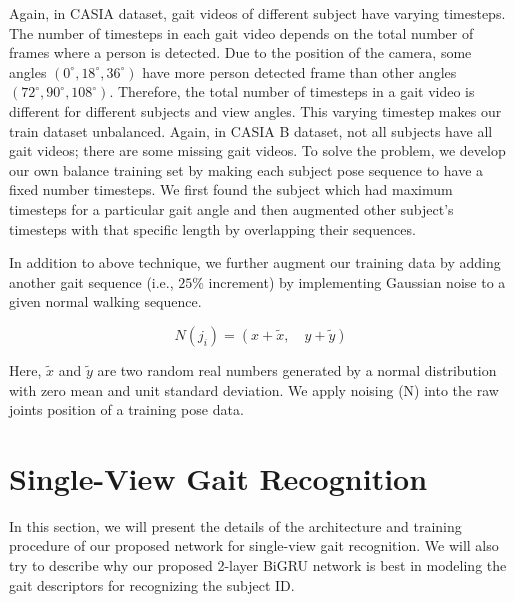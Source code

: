 Again, in CASIA dataset, gait videos of different subject have varying timesteps. The number of timesteps in each gait video depends on the total number of frames where a person is detected. Due to the position of the camera, some angles ${(0^{\circ}, 18^{\circ}, 36^{\circ})}$ have more person detected frame than other angles ${(72^{\circ}, 90^{\circ}, 108^{\circ})}$. Therefore, the total number of timesteps in a gait video is different for different subjects and view angles. This varying timestep makes our train dataset unbalanced. Again, in CASIA B dataset, not all subjects have all gait videos; there are some missing gait videos. To solve the problem, we develop our own balance training set by making each subject pose sequence to have a fixed number timesteps. We first found the subject which had maximum timesteps for a particular gait angle and then augmented other subject's timesteps with that specific length by overlapping their sequences.

In addition to above technique, we further augment our training data by adding another gait sequence (i.e., $ 25\% $ increment) by implementing Gaussian noise to a given normal walking sequence. 

\begin{equation}
N(j_i) = (x + \tilde{x},  \quad y+ \tilde{y})
\end{equation}

Here,  $\tilde{x}$ and $\tilde{y}$ are two random real numbers generated by a normal distribution with zero mean and unit standard deviation. We apply noising (N) into the raw joints position of a training pose data.


\section{Single-View Gait Recognition}
In this section, we will present the details of the architecture and training procedure of our proposed network for single-view gait recognition. We will also try to describe why our proposed 2-layer BiGRU network is best in modeling the gait descriptors for recognizing the subject ID.

